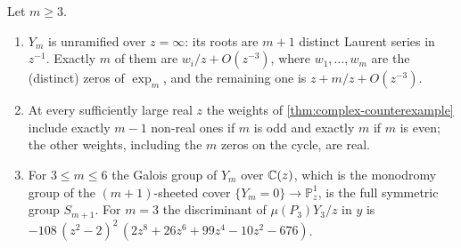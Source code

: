 \begin{proposition}\label{prop:Ym-arithmetic}
Let $m\ge3$.
\begin{enumerate}[label=\textup{(\arabic*)}]
\item $Y_m$ is unramified over $z=\infty$: its roots are $m+1$ distinct Laurent series in $z^{-1}$. Exactly $m$ of them are $w_i/z+O(z^{-3})$, where $w_1,\dots,w_m$ are the \textup{(}distinct\textup{)} zeros of $\exp_m$, and the remaining one is $z+m/z+O(z^{-3})$.
\item At every sufficiently large real $z$ the weights of \cref{thm:complex-counterexample} include exactly $m-1$ non-real ones if $m$ is odd and exactly $m$ if $m$ is even; the other weights, including the $m$ zeros on the cycle, are real.
\item For $3\le m\le6$ the Galois group of $Y_m$ over $\mathbb{C}(z)$, which is the monodromy group of the $(m+1)$-sheeted cover $\{Y_m=0\}\to\mathbb P^{1}_z$, is the full symmetric group $S_{m+1}$. For $m=3$ the discriminant of $\mu(P_3)Y_3/z$ in $y$ is $-108\,(z^{2}-2)^{2}\,(2z^{8}+26z^{6}+99z^{4}-10z^{2}-676)$.
\end{enumerate}
\end{proposition}
